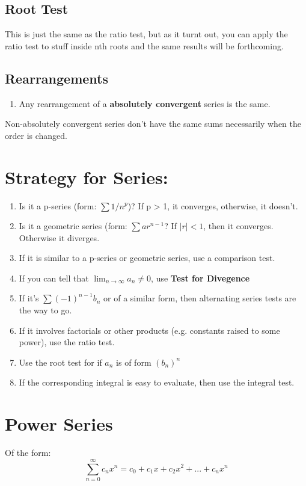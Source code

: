 \documentclass[a4paper,12pt]{report}
\begin{document}
\subsection{Root Test}
This is just the same as the ratio test, but as it turnt out, you can apply the ratio test to stuff inside nth roots and the same results will be forthcoming. 

\subsection{Rearrangements}
\begin{enumerate}
\item Any rearrangement of a \textbf{absolutely convergent} series is the same.
\end{enumerate}

Non-absolutely convergent series don't have the same sums necessarily when the order is changed. 

\section{Strategy for Series: }
\begin{enumerate}
\item Is it a p-series (form: $\sum 1/{n^p}$)? If p > 1, it converges, otherwise, it doesn't. 
\item Is it a geometric series (form: $\sum ar^{n-1}$? If $|r| < 1$, then it converges. Otherwise it diverges.
\item If it is similar to a p-series or geometric series, use a comparison test.
\item If you can tell that $\lim_{n\to\infty} a_n \neq 0$, use \textbf{Test for Divegence} 
\item If it's $\sum(-1)^{n-1}b_n$ or of a similar form, then alternating series tests are the way to go. 
\item If it involves factorials or other products (e.g. constants raised to some power), use the ratio test. 
\item Use the root test for if $a_n$ is of form $(b_n)^n$
\item If the corresponding integral is easy to evaluate, then use the integral test. 
\end{enumerate}

\section{Power Series}
Of the form: 
$$\sum_{n=0}^{\infty} c_n x^n = c_0 + c_1x + c_2x^2 + ... + c_nx^n$$
\end{document}

